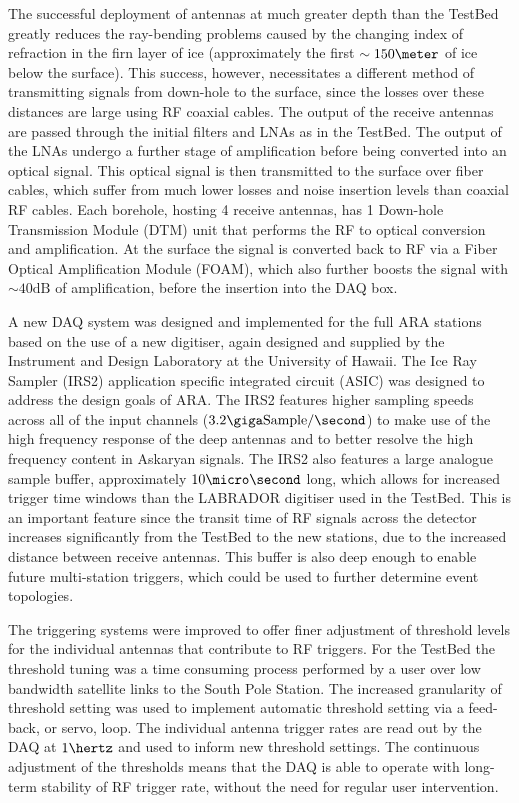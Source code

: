 The successful deployment of antennas at much greater depth than the TestBed greatly reduces the ray-bending problems caused by the changing index of refraction in the firn layer of ice (approximately the first $\sim 150 \meter$ of ice below the surface). This success, however, necessitates a different method of transmitting signals from down-hole to the surface, since the losses over these distances are large using RF coaxial cables. The output of the receive antennas are passed through the initial filters and LNAs as in the TestBed. The output of the LNAs undergo a further stage of amplification before being converted into an optical signal. This optical signal is then transmitted to the surface over fiber cables, which suffer from much lower losses and noise insertion levels than coaxial RF cables. Each borehole, hosting 4 receive antennas, has 1 Down-hole Transmission Module (DTM) unit that performs the RF to optical conversion and amplification. At the surface the signal is converted back to RF via a Fiber Optical Amplification Module (FOAM), which also further boosts the signal with $\sim 40 \mbox{dB}$ of amplification, before the insertion into the DAQ box.

A new DAQ system was designed and implemented for the full ARA stations based on the use of a new digitiser, again designed and supplied by the Instrument and Design Laboratory at the University of Hawaii. The Ice Ray Sampler (IRS2) application specific integrated circuit (ASIC) was designed to address the design goals of ARA. The IRS2 features higher sampling speeds across all of the input channels ($3.2 \giga \mbox{Sample} /\second$) to make use of the high frequency response of the deep antennas and to better resolve the high frequency content in Askaryan signals. The IRS2 also features a large analogue sample buffer, approximately $10 \micro \second$ long, which allows for increased trigger time windows than the LABRADOR digitiser used in the TestBed. This is an important feature since the transit time of RF signals across the detector increases significantly from the TestBed to the new stations, due to the increased distance between receive antennas. This buffer is also deep enough to enable future multi-station triggers, which could be used to further determine event topologies.

The triggering systems were improved to offer finer adjustment of threshold levels for the individual antennas that contribute to RF triggers. For the TestBed the threshold tuning was a time consuming process performed by a user over low bandwidth satellite links to the South Pole Station. The increased granularity of threshold setting was used to implement automatic threshold setting via a feed-back, or servo, loop. The individual antenna trigger rates are read out by the DAQ at $1 \hertz$ and used to inform new threshold settings. The continuous adjustment of the thresholds means that the DAQ is able to operate with long-term stability of RF trigger rate, without the need for regular user intervention.

